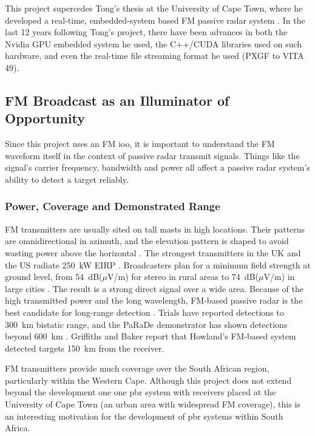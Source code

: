 This project supercedes Tong's thesis at the University of Cape Town, where he developed a real-time, embedded-system based FM passive radar system \cite{tong2014}. In the last 12 years following Tong's project, there have been advances in both the Nvidia GPU embedded system he used, the C++/CUDA libraries used on such hardware, and even the real-time file streaming format he used (PXGF to VITA 49).

\subsection{FM Broadcast as an Illuminator of Opportunity}
\label{subsec:ch2.pbr.fm}

Since this project uses an FM \gls{ioo}, it is important to understand the FM waveform itself in the context of passive radar transmit signals. Things like the signal's carrier frequency, bandwidth and power all affect a passive radar system's ability to detect a target reliably.
\subsubsection{Power, Coverage and Demonstrated Range}
\label{subsubsec:ch2.pbr.fm.power}

FM transmitters are usually sited on tall masts in high locations. Their patterns are omnidirectional in azimuth, and the elevation pattern is shaped to avoid wasting power above the horizontal \citep{griffiths2007}. The strongest transmitters in the UK and the US radiate 250~kW EIRP \citep{griffiths2007}. Broadcasters plan for a minimum field strength at ground level, from 54~dB($\mu$V/m) for stereo in rural areas to 74~dB($\mu$V/m) in large cities \citep{itu_bs412}. The result is a strong direct signal over a wide area. Because of the high transmitted power and the long wavelength, FM-based passive radar is the best candidate for long-range detection \citep{malanowski2014}. Trials have reported detections to 300~km bistatic range, and the PaRaDe demonstrator has shown detections beyond 600~km \citep{malanowski2014}. Griffiths and Baker \citep{griffiths2007} report that Howland's FM-based system detected targets 150~km from the receiver.

FM transmitters provide much coverage over the South African region, particularly within the Western Cape. Although this project does not extend beyond the development one one \gls{pbr} system with receivers placed at the University of Cape Town (an urban area with widespread FM coverage), this is an interesting motivation for the development of \gls{pbr} systems within South Africa.


